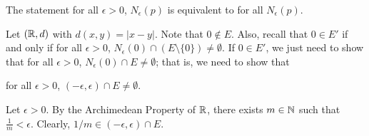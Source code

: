 \documentclass[a4paper]{report}
\begin{document}
\begin{remark}
    The statement for all \( \epsilon > 0 \), \( {N}_{\epsilon}(p) \) is equivalent to for all \( {N}_{\epsilon}(p) \).
\end{remark}

\begin{eg}
    Let \( (\mathbb{R}, d) \) with \( d(x,y) = | x - y |  \). Note that \(  0 \notin E  \). Also, recall that \( 0 \in E' \) if and only if for all \( \epsilon > 0  \), \( {N}_{\epsilon}(0) \cap (E \setminus  \{ 0  \} ) \neq \emptyset \). If \( 0 \in E' \), we just need to show that for all \( \epsilon > 0  \), \( {N}_{\epsilon}(0) \cap E \neq \emptyset \); that is, we need to show that  
    \begin{center}
        for all \( \epsilon > 0  \), \( (-\epsilon, \epsilon) \cap E \neq \emptyset \).
    \end{center}
    Let \( \epsilon > 0  \). By the Archimedean Property of \( \mathbb{R}  \), there exists \( m \in \mathbb{N}  \) such that \( \frac{ 1 }{ m }  < \epsilon  \). Clearly, \( 1/m \in (-\epsilon, \epsilon ) \cap E  \).
\end{eg}
\end{document}
